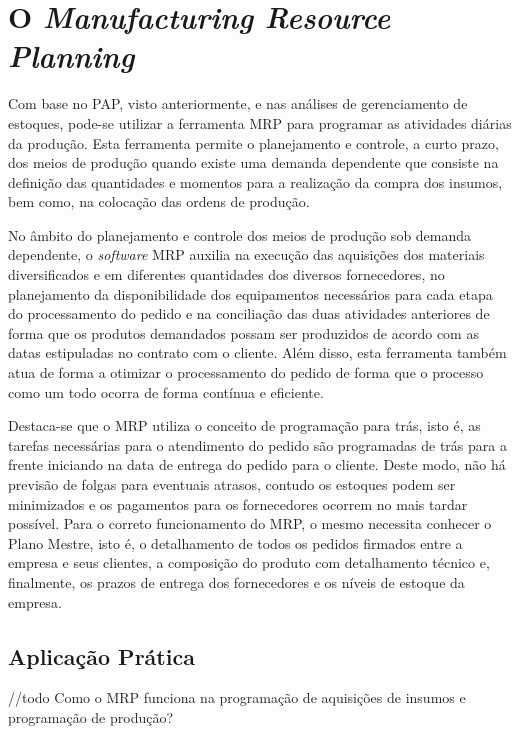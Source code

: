 \chapter{O \textit{Manufacturing Resource Planning}}
\label{chap:manufacturing_resource_planning}

Com base no \ac{PAP}, visto anteriormente, e nas análises de gerenciamento de estoques, pode-se utilizar a ferramenta \ac{MRP} para programar as atividades diárias da produção. Esta ferramenta permite o planejamento e controle, a curto prazo, dos meios de produção quando existe uma demanda dependente que consiste na definição das quantidades e momentos para a realização da compra dos insumos, bem como, na colocação das ordens de produção.

No âmbito do planejamento e controle dos meios de produção sob demanda dependente, o \textit{software} \ac{MRP} auxilia na execução das aquisições dos materiais diversificados e em diferentes quantidades dos diversos fornecedores, no planejamento da disponibilidade dos equipamentos necessários para cada etapa do processamento do pedido e na conciliação das duas atividades anteriores de forma que os produtos demandados possam ser produzidos de acordo com as datas estipuladas no contrato com o cliente. Além disso, esta ferramenta também atua de forma a otimizar o processamento do pedido de forma que o processo como um todo ocorra de forma contínua e eficiente.

Destaca-se que o \ac{MRP} utiliza o conceito de programação para trás, isto é, as tarefas necessárias para o atendimento do pedido são programadas de trás para a frente iniciando na data de entrega do pedido para o cliente. Deste modo, não há previsão de folgas para eventuais atrasos, contudo os estoques podem ser minimizados e os pagamentos para os fornecedores ocorrem no mais tardar possível. Para o correto funcionamento do \ac{MRP}, o mesmo necessita conhecer o Plano Mestre, isto é, o detalhamento de todos os pedidos firmados entre a empresa e seus clientes, a composição do produto com detalhamento técnico e, finalmente, os prazos de entrega dos fornecedores e os níveis de estoque da empresa.


\section{Aplicação Prática}
\label{sec:manufacturing_resource_planning_aplicacao}

//todo Como o MRP funciona na programação de aquisições de insumos e programação de produção?